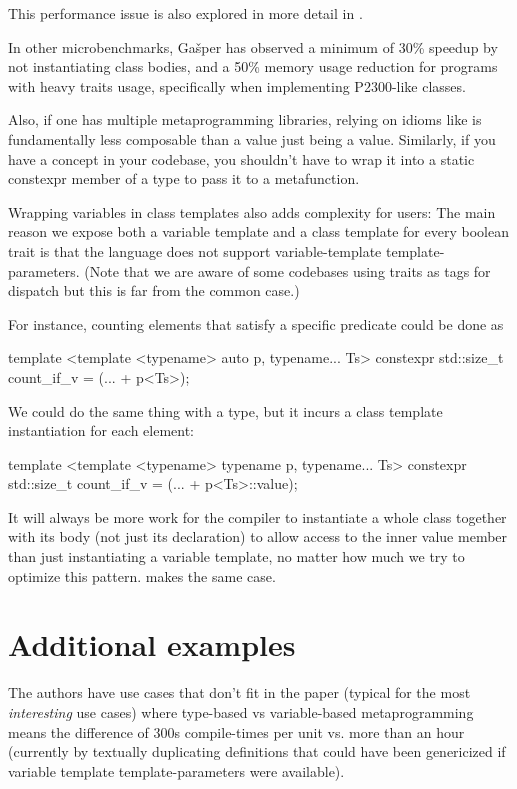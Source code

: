 \documentclass{wg21}
\begin{document}
This performance issue is also explored in more detail in .

In other microbenchmarks, Gašper has observed a minimum of 30\% speedup by not instantiating class bodies, and a 50\% memory usage reduction for programs with heavy traits usage, specifically when implementing P2300-like classes.

Also, if one has multiple metaprogramming libraries, relying on idioms like  is fundamentally less composable than a value just being a value.
Similarly, if you have a concept in your codebase, you shouldn't have to wrap it into a static constexpr  member of a type to pass it to a metafunction.

Wrapping variables in class templates also adds complexity for users: The main reason we expose both a variable template and a class template for every boolean trait is that the language does not support variable-template template-parameters. (Note that we are aware of some codebases using traits as tags for dispatch but this is far from the common case.)

For instance, counting elements  that satisfy a specific predicate  could be done as

\begin{colorblock}
template <template <typename> auto p, typename... Ts>
constexpr std::size_t count_if_v = (... + p<Ts>);
\end{colorblock}

We could do the same thing with a type, but it incurs a class template instantiation for each element:

\begin{colorblock}
template <template <typename> typename p, typename... Ts>
constexpr std::size_t count_if_v = (... + p<Ts>::value);
\end{colorblock}

It will always be more work for the compiler to instantiate a whole class together with its body (not just its declaration) to allow access to the inner value member than just instantiating a variable template, no matter how much we try to optimize this pattern.  makes the same case.

\section{Additional examples}

The authors have use cases that don't fit in the paper (typical for the most \emph{interesting} use cases) where type-based vs variable-based metaprogramming means the difference of 300s compile-times per unit vs. more than an hour (currently by textually duplicating definitions that could have been genericized if variable template template-parameters were available).
\end{document}
